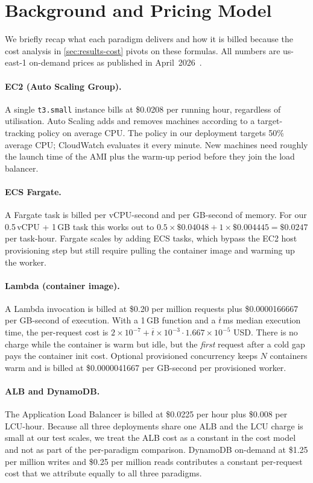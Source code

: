 \section{Background and Pricing Model}
\label{sec:background}

We briefly recap what each paradigm delivers and how it is billed
because the cost analysis in \cref{sec:results-cost} pivots on these
formulas. All numbers are us-east-1 on-demand prices as published in
April~2026~\cite{aws-price-ec2,aws-price-fargate,aws-price-lambda,aws-price-ddb}.

\paragraph{EC2 (Auto Scaling Group).} A single \texttt{t3.small}
instance bills at \$0.0208 per running hour, regardless of utilisation.
Auto Scaling adds and removes machines according to a target-tracking
policy on average CPU. The policy in our deployment targets 50\%
average CPU; CloudWatch evaluates it every minute. New machines need
roughly the launch time of the AMI plus the warm-up period before they
join the load balancer.

\paragraph{ECS Fargate.} A Fargate task is billed per vCPU-second and
per GB-second of memory. For our 0.5\,vCPU + 1\,GB task this works out
to $0.5{\times}\$0.04048 + 1{\times}\$0.004445 = \$0.0247$ per task-hour.
Fargate scales by adding ECS tasks, which bypass the EC2 host
provisioning step but still require pulling the container image and
warming up the worker.

\paragraph{Lambda (container image).} A Lambda invocation is billed at
\$0.20 per million requests plus \$0.0000166667 per GB-second of
execution. With a 1\,GB function and a $\overline{t}$\,ms median
execution time, the per-request cost is
$2{\times}10^{-7} + \overline{t}{\times}10^{-3} \cdot 1.667{\times}10^{-5}$
USD. There is no charge while the container is warm but idle, but the
\emph{first} request after a cold gap pays the container init cost.
Optional provisioned concurrency keeps $N$ containers warm and is
billed at \$0.0000041667 per GB-second per provisioned worker.

\paragraph{ALB and DynamoDB.} The Application Load Balancer is billed at
\$0.0225 per hour plus \$0.008 per LCU-hour. Because all three
deployments share one ALB and the LCU charge is small at our test
scales, we treat the ALB cost as a constant in the cost model and not
as part of the per-paradigm comparison. DynamoDB on-demand at
\$1.25 per million writes and \$0.25 per million reads contributes a
constant per-request cost that we attribute equally to all three
paradigms.

